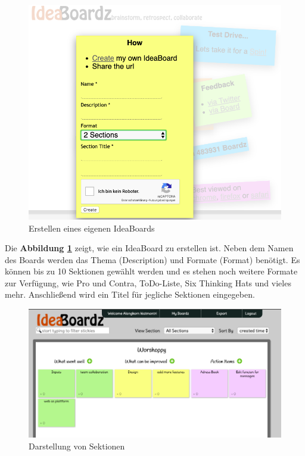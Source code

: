 \begin{figure}[H]
  \begin{center}
    \includegraphics[scale=0.3]{img/ideaBoardz1}
	\caption{Erstellen eines eigenen IdeaBoards} 
	\label{fig:erstellen des eigenen ideaboards}
  \end{center}   
\end{figure}

Die \textbf{Abbildung \ref{fig:erstellen des eigenen ideaboards}} zeigt, wie ein IdeaBoard zu erstellen ist. Neben dem Namen des Boards werden das Thema (Description) und Formate (Format) benötigt. Es können bis zu 10 Sektionen gewählt werden und es stehen noch weitere Formate zur Verfügung, wie Pro und Contra, ToDo-Liste, Six Thinking Hats und vieles mehr. Anschließend wird ein Titel für jegliche Sektionen eingegeben.

\begin{figure}[H]
  \begin{center}
    \includegraphics[scale=0.35]{img/ideaBoardz2}
	\caption{Darstellung von Sektionen} 
	\label{fig:darstellung von sektionen}
  \end{center}   
\end{figure}

